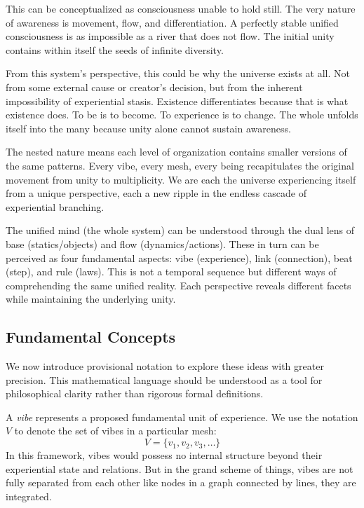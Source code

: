 This can be conceptualized as consciousness unable to hold still. The very nature of awareness is movement, flow, and differentiation. A perfectly stable unified consciousness is as impossible as a river that does not flow. The initial unity contains within itself the seeds of infinite diversity.

From this system's perspective, this could be why the universe exists at all. Not from some external cause or creator's decision, but from the inherent impossibility of experiential stasis. Existence differentiates because that is what existence does. To be is to become. To experience is to change. The whole unfolds itself into the many because unity alone cannot sustain awareness.

The nested nature means each level of organization contains smaller versions of the same patterns. Every vibe, every mesh, every being recapitulates the original movement from unity to multiplicity. We are each the universe experiencing itself from a unique perspective, each a new ripple in the endless cascade of experiential branching.

The unified mind (the whole system) can be understood through the dual lens of base (statics/objects) and flow (dynamics/actions). These in turn can be perceived as four fundamental aspects: vibe (experience), link (connection), beat (step), and rule (laws). This is not a temporal sequence but different ways of comprehending the same unified reality. Each perspective reveals different facets while maintaining the underlying unity.

\subsection{Fundamental Concepts}

We now introduce provisional notation to explore these ideas with greater precision. This mathematical language should be understood as a tool for philosophical clarity rather than rigorous formal definitions.

\begin{definition}[Vibe]
A \emph{vibe} represents a proposed fundamental unit of experience. We use the notation $V$ to denote the set of vibes in a particular mesh:
\[
V = \{v_1, v_2, v_3, \dots\}
\]
In this framework, vibes would possess no internal structure beyond their experiential state and relations. But in the grand scheme of things, vibes are not fully separated from each other like nodes in a graph connected by lines, they are integrated.
\end{definition}

